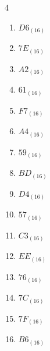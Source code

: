 \begin{multicols}{4}
\begin{enumerate}
  \item $D6_{(16)}$

        \phantom{$=214$}

  \item $7E_{(16)}$

        \phantom{$=126$}

  \item $A2_{(16)}$

        \phantom{$=162$}

  \item $61_{(16)}$

        \phantom{$=97$}

  \item $F7_{(16)}$

        \phantom{$=247$}

  \item $A4_{(16)}$

        \phantom{$=164$}

\columnbreak %

  \item $59_{(16)}$

        \phantom{$=89$}

  \item $BD_{(16)}$

        \phantom{$=189$}

  \item $D4_{(16)}$

        \phantom{$=212$}

  \item $57_{(16)}$

        \phantom{$=87$}

  \item $C3_{(16)}$

        \phantom{$=195$}

  \item $EE_{(16)}$

        \phantom{$=238$}

  \item $76_{(16)}$

        \phantom{$=118$}

  \item $7C_{(16)}$

        \phantom{$=124$}

  \item $7F_{(16)}$

        \phantom{$=127$}

  \item $B6_{(16)}$


\end{enumerate}
\end{multicols}
